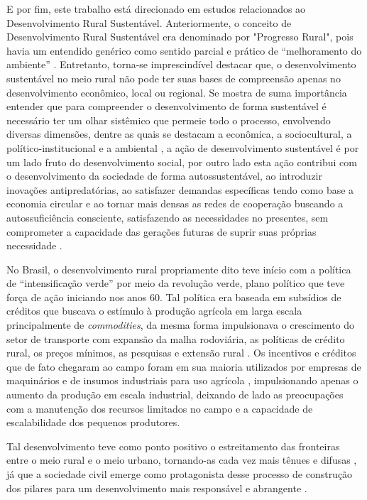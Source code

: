 E por fim, este trabalho está direcionado em estudos relacionados ao Desenvolvimento Rural Sustentável. Anteriormente, o conceito de Desenvolvimento Rural Sustentável era denominado por "Progresso Rural", pois havia um entendido genérico como sentido parcial e prático de “melhoramento do ambiente” \cite{almeida_da_1995}. Entretanto, torna-se imprescindível destacar que, o desenvolvimento sustentável no meio rural não pode ter suas bases de compreensão apenas no desenvolvimento econômico, local ou regional. Se mostra de suma importância entender que para compreender o desenvolvimento de forma sustentável é necessário ter um olhar sistêmico que permeie todo o processo, envolvendo diversas dimensões, dentre as quais se destacam a econômica, a sociocultural, a político-institucional e a ambiental \cite{vieira_politica_2015}, a ação de desenvolvimento sustentável é por um lado fruto do desenvolvimento social, por outro lado esta ação contribui com o desenvolvimento da sociedade de forma autossustentável, ao introduzir inovações antipredatórias, ao satisfazer demandas específicas tendo como base a economia circular e ao tornar mais densas as redes de cooperação buscando a autossuficiência consciente, satisfazendo as necessidades no presentes, sem comprometer a capacidade das gerações futuras de suprir suas próprias necessidade \cite{onu_sustainable_2016}.

No Brasil, o desenvolvimento rural propriamente dito teve início com a política de “intensificação verde” por meio da revolução verde, plano político que teve força de ação iniciando nos anos 60. Tal política era baseada em subsídios de créditos que buscava o estímulo à produção agrícola em larga escala principalmente de \textit{commodities}, da mesma forma impulsionava o crescimento do setor de transporte com expansão da malha rodoviária, as políticas de crédito rural, os preços mínimos, as pesquisas e extensão rural \cite{kageyama_o_1990}. Os incentivos e créditos que de fato chegaram ao campo foram em sua maioria utilizados por empresas de maquinários e de insumos industriais para uso agrícola \cite{strassburg_producao_2015}, impulsionando apenas o aumento da produção em escala industrial, deixando de lado as preocupações com a manutenção dos recursos limitados no campo e a capacidade de escalabilidade dos pequenos produtores.

Tal desenvolvimento teve como ponto positivo o estreitamento das fronteiras entre o meio rural e o meio urbano, tornando-as cada vez mais tênues e difusas \cite{freitas_mudancas_2012}, já que a sociedade civil emerge como protagonista desse processo de construção dos pilares para um desenvolvimento mais responsável e abrangente \cite{de_souza_empreendedorismo_2016}. 

